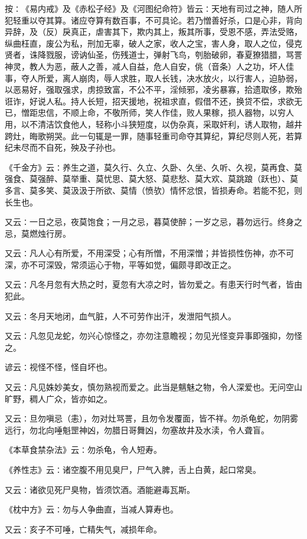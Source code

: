 \documentclass[a4paper,12pt,UTF8,twoside]{ctexbook}
\begin{document}
按∶《易内戒》及《赤松子经》及《河图纪命符》皆云∶天地有司过之神，随人所犯轻重以夺其算。诸应夺算有数百事，不可具论。若乃憎善好杀，口是心非，背向异辞，及（反）戾真正，虐害其下，欺内其上，叛其所事，受恩不感，弄法受赂，纵曲枉直，废公为私，刑加无辜，破人之家，收人之宝，害人身，取人之位，侵克贤者，诛降戮服，谤讷仙圣，伤残道士，弹射飞鸟，刳胎破卵，春夏獠猎腊，骂詈神灵，教人为恶，蔽人之善，减人自益，危人自安，佻（音条）人之功，坏人佳事，夺人所爱，离人崩肉，辱人求胜，取人长钱，决水放火，以行害人，迫胁弱，以恶易好，强取强求，虏掠致富，不公不平，淫倾邪，凌劣暴寡，拾遗取侈，欺殆诳诈，好说人私。持人长短，招天援地，祝祖求直，假借不还，换贷不偿，求欲无已，憎距忠信，不顺上命，不敬所师，笑人作佳，败人果稼，损人器物，以穷人用，以不清洁饮食他人，轻称小斗狭短度，以伪杂真，采取奸利，诱人取物，越井跨灶，晦歌朔哭。此一句辄是一罪，随事轻重司命夺其算纪，算纪尽则人死，若算纪未尽而不自死，殃及子孙也。

《千金方》云∶养生之道，莫久行、久立、久卧、久坐、久听、久视，莫再食、莫强食、莫强醉、莫举重、莫忧思、莫大怒、莫悲愁、莫大欢、莫跳踉（跃也）、莫多言、莫多笑、莫汲汲于所欲、莫情（愤欤）情怀忿恨，皆损寿命。若能不犯，则长生也。

又云∶一日之忌，夜莫饱食；一月之忌，暮莫使醉；一岁之忌，暮勿远行。终身之忌，莫燃烛行房。

又云∶凡人心有所爱，不用深受；心有所憎，不用深憎；并皆损性伤神，亦不可深，亦不可深毁，常须运心于物，平等如觉，偏颇寻即改正之。

又云∶凡冬月忽有大热之时，夏忽有大凉之时，皆勿爱之。有患天行时气者，皆由犯此。

又云∶冬月天地闭，血气脏，人不可劳作出汗，发泄阳气损人。

又云∶凡忽见龙蛇，勿兴心惊怪之，亦勿注意瞻视；勿见光怪变异事即强抑，勿怪之。

谚云∶视怪不怪，怪自坏也。

又云∶凡见姝妙美女，慎勿熟视而爱之。此当是魑魅之物，令人深爱也。无问空山旷野，稠人广众，皆亦如之。

又云∶旦勿嗔忌（恚），勿对灶骂詈，且勿令发覆面，皆不祥。勿杀龟蛇，勿阴雾远行，勿北向唾魁罡神凶，勿腊日哥舞凶，勿塞故井及水渎，令人聋盲。

《本草食禁杂法》云∶勿杀龟，令人短寿。

《养性志》云∶诸空腹不用见臭尸，尸气入脾，舌上白黄，起口常臭。

又云∶诸欲见死尸臭物，皆须饮酒。酒能避毒瓦斯。

《枕中方》云∶勿与人争曲直，当减人算寿也。

又云∶亥子不可唾，亡精失气，减损年命。
\end{document}
